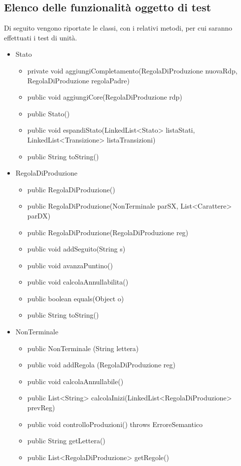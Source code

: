 \documentclass[12pt]{article}
\begin{document}
\subsection{Elenco delle funzionalità oggetto di test}
Di seguito vengono riportate le classi, con i relativi metodi, per cui saranno effettuati i test di unità.
\begin{itemize}
\item Stato
\begin{itemize}
\item private void aggiungiCompletamento(RegolaDiProduzione nuovaRdp, RegolaDiProduzione regolaPadre)
\item public void aggiungiCore(RegolaDiProduzione rdp)
\item public Stato()
\item public void espandiStato(LinkedList<Stato> listaStati, LinkedList<Transizione> listaTransizioni)
\item public String toString()
\end{itemize}
\item RegolaDiProduzione
\begin{itemize}
\item public RegolaDiProduzione()
\item public RegolaDiProduzione(NonTerminale parSX, List<Carattere> parDX)
\item public RegolaDiProduzione(RegolaDiProduzione reg)
\item public void addSeguito(String s)
\item public void avanzaPuntino()
\item public void calcolaAnnullabilita()
\item public boolean equals(Object o)
\item public String toString()
\end{itemize}
\item NonTerminale
\begin{itemize}
\item public NonTerminale (String lettera)
\item public void addRegola (RegolaDiProduzione reg)
\item public void calcolaAnnullabile()
\item public List<String> calcolaInizi(LinkedList<RegolaDiProduzione> prevReg)
\item public void controlloProduzioni() throws ErroreSemantico
\item public String getLettera()
\item public List<RegolaDiProduzione> getRegole()

\end{itemize}
\end{itemize}
\end{document}
